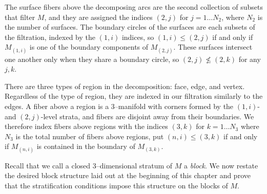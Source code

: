 The surface fibers above the decomposing arcs are the second collection of subsets that filter $M$, and they are assigned the indices $(2,j)$ for $j=1\dots N_2$, where $N_2$ is the number of surfaces.
The boundary circles of the surfaces are each subsets of the filtration, indexed by the $(1,i)$ indices, so $(1,i)\leq (2,j)$ if and only if $M_{(1,i)}$ is one of the boundary components of $M_{(2,j)}$.
These surfaces intersect one another only when they share a boundary circle, so $(2,j)\nleq (2,k)$ for any $j,k$.

There are three types of region in the decomposition: face, edge, and vertex.
Regardless of the type of region, they are indexed in our filtration similarly to the edges.
A fiber above a region is a 3--manifold with corners formed by the $(1,i)$- and $(2,j)$-level strata, and fibers are disjoint away from their boundaries.
We therefore index fibers above regions with the indices $(3,k)$ for $k=1\dots N_3$ where $N_3$ is the total number of fibers above regions, put $(n,i)\leq (3,k)$ if and only if $M_{(n,i)}$ is contained in the boundary of $M_{(3,k)}$.

Recall that we call a closed 3--dimensional stratum of $M$ a \emph{block}.
We now restate the desired block structure laid out at the beginning of this chapter and prove that the stratification conditions impose this structure on the blocks of $M$.

